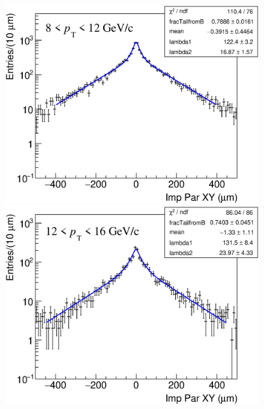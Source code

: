 \documentclass[b5paper,10pt,twoside,oldstyle,classica]{toptesi}
\begin{document}
\begin{figure}[h]
\begin{center}
\hspace{0cm}
{\includegraphics[scale = 0.24]{ImpParTrueFD_8-12.eps}}
\vspace{0cm}
{\includegraphics[scale = 0.24]{ImpParTrueFD_12-16.eps}}
\end{center}
\end{figure}
\clearpage
\end{document}
